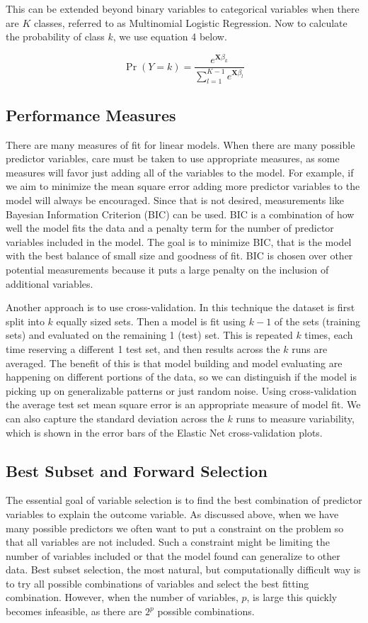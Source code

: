\documentclass{article}
\newcommand{\bX}{\mathbf{X}}
\begin{document}
This can be extended beyond binary variables to categorical variables when there are $K$ classes, referred to as Multinomial 
Logistic Regression. Now to calculate the probability of class $k$, we use equation 4 below.

\[ \Pr(Y = k) = \frac{e^{\bX\beta_k}}{\sum_{l=1}^{K-1} e^{\bX\beta_l}} \tag{4}\]

\subsection{Performance Measures}

There are many measures of fit for linear models. When there are many possible predictor variables, care must be taken 
to use appropriate measures, as some measures will favor just adding all of the variables to the model. For example, if we 
aim to minimize the mean square error adding more predictor variables to the model will always be encouraged. Since that is 
not desired, measurements like Bayesian Information Criterion (BIC) can be used. BIC is a combination of how well the model 
fits the data and a penalty term for the number of predictor variables included in the model. The goal is to minimize BIC, that is 
the model with the best balance of small size and goodness of fit. BIC is chosen over other potential measurements because it 
puts a large penalty on the inclusion of additional variables.

Another approach is to use cross-validation. In this technique the dataset is first split into $k$ equally sized sets. Then a 
model is fit using $k - 1$ of the sets (training sets) and evaluated on the remaining 1 (test) set. This is repeated $k$ times, 
each time reserving a different 1 test set, and then results across the $k$ runs are averaged. The benefit of this is that model 
building and model evaluating are happening on different portions of the data, so we can distinguish if the model is picking up 
on generalizable patterns or just random noise. Using cross-validation the average test set mean square error is an 
appropriate measure of model fit. We can also capture the standard deviation across the $k$ runs to measure variability, which is shown in the error bars of the Elastic Net cross-validation plots.

\subsection{Best Subset and Forward Selection}

The essential goal of variable selection is to find the best combination of predictor variables to explain the outcome variable. As 
discussed above, when we have many possible predictors we often want to put a constraint on the problem so that all variables 
are not included. Such a constraint might be limiting the number of variables included or that the model found can generalize to 
other data. Best subset selection, the most natural, but computationally difficult way is to try all possible combinations of 
variables and select the best fitting combination. However, when the number of variables, $p$, is large this quickly becomes 
infeasible, as there are $2^p$ possible combinations. 
\end{document}

